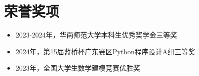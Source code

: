 \documentclass{resume}
\begin{document}

\section{荣誉奖项}
\begin{normalsize}
  \begin{itemize}[parsep=0.5ex]
    \item 2023-2024年，华南师范大学本科生优秀奖学金三等奖
    \item 2024年，第15届蓝桥杯广东赛区Python程序设计A组三等奖
    \item 2023年，全国大学生数学建模竞赛优胜奖
  \end{itemize}
\end{normalsize}

\end{document}
